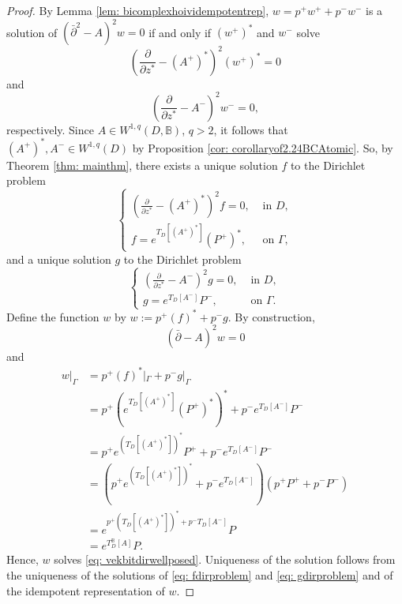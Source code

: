 \documentclass[12pt,reqno]{amsart}
\theoremstyle{definition}
\theoremstyle{remark}
\newcommand{\p}{\partial}
\newcommand{\dbar}{\bar\partial}
\newcommand{\bc}{\mathbb{B}}
\begin{document}
    \begin{proof}

        By Lemma \ref{lem: bicomplexhoividempotentrep}, $w = p^+ w^+ + p^-w^-$ is a solution of $(\dbar^2 - A)^2 w = 0$ if and only if $(w^+)^*$ and $w^-$ solve
                 \[
                        \left( \frac{\p }{\p z^*} - (A^+)^*\right)^2 (w^+)^* = 0
                 \]
                 and 
                 \[ 
                        \left( \frac{\p}{\p z^*} - A^-\right)^2 w^- = 0,
                 \]
                 respectively. Since $A \in W^{1,q}(D, \bc)$, $q>2$, it follows that $(A^+)^*, A^- \in W^{1, q}(D)$ by Proposition \ref{cor: corollaryof2.24BCAtomic}. So, by Theorem \ref{thm: mainthm}, there exists a unique solution $f$ to the Dirichlet problem
                 \begin{equation}\label{eq: fdirproblem}
                    \begin{cases}
                        \left(\frac{\p}{\p z^*} - (A^+)^* \right)^2 f = 0,& \text{ in } D,\\
                        f = e^{T_D[(A^+)^*]} (P^+)^*, & \text{ on } \Gamma,
                    \end{cases}
                 \end{equation}
                and a unique solution $g$ to the Dirichlet problem 
                \begin{equation}\label{eq: gdirproblem}
                    \begin{cases}
                        \left( \frac{\p}{\p z^*} - A^-\right)^2 g = 0,& \text{ in } D,\\
                        g = e^{T_D[A^-]} P^-, & \text{ on } \Gamma.
                    \end{cases}
                 \end{equation}
                 Define the function $w$ by $w:= p^+ (f)^* + p^- g$. By construction, 
                 \[
                    (\dbar - A)^2 w = 0
                 \]
                 and 
                \begin{align*}
                    w|_{\Gamma} &= 
                    p^+ (f)^*|_{\Gamma} + p^- g|_{\Gamma}\\
                    &= p^+ (e^{T_D[(A^+)^*]} (P^+)^*)^* + p^- e^{T_D[A^-]}P^-\\
                    &= p^+ e^{(T_D[(A^+)^*])^*} P^+ + p^- e^{T_D[A^-]} P^-\\
                    &= (p^+ e^{(T_D[(A^+)^*])^*}+p^- e^{T_D[A^-]})(p^+P^+ + p^- P^-)\\
                    &= e^{p^+ (T_D[(A^+)^*])^* + p^- T_D[A^-]}P\\
                    &= e^{T_D^\bc[A]} P .
                \end{align*}
                Hence, $w$ solves \eqref{eq: vekbitdirwellposed}. Uniqueness of the solution follows from the uniqueness of the solutions of \eqref{eq: fdirproblem} and \eqref{eq: gdirproblem} and of the idempotent representation of $w$. 
 
            \end{proof}
\end{document}

